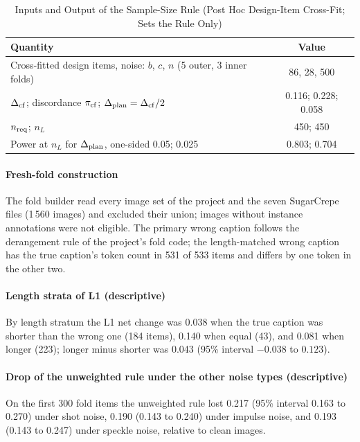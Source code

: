 \documentclass[journal,onecolumn]{IEEEtran}
\theoremstyle{plain}
\begin{document}
\begin{table}[!htbp]
\centering
\caption{Inputs and Output of the Sample-Size Rule (Post Hoc Design-Item Cross-Fit; Sets the Rule Only)}
\label{stab:nrule}
\footnotesize
\begin{tabular}{lc}
\toprule
Quantity & Value \\
\midrule
Cross-fitted design items, noise: $b$, $c$, $n$ (5 outer, 3 inner folds) & 86, 28, 500 \\
$\Delta_{\rm cf}$; discordance $\pi_{\rm cf}$; $\Delta_{\rm plan}=\Delta_{\rm cf}/2$ & 0.116; 0.228; 0.058 \\
$n_{\rm req}$; $n_L$ & 450; 450 \\
Power at $n_L$ for $\Delta_{\rm plan}$, one-sided 0.05; 0.025 & 0.803; 0.704 \\
\bottomrule
\end{tabular}
\end{table}

\paragraph*{Fresh-fold construction}
The fold builder read every image set of the project and the seven SugarCrepe files (1\,560 images) and excluded their union; images
without instance annotations were not eligible.
The primary wrong caption follows the derangement rule of the project's fold code; the length-matched wrong caption has the true caption's
token count in 531 of 533 items and differs by one token in the other two.

\paragraph*{Length strata of L1 (descriptive)}
By length stratum the L1 net change was 0.038 when the true caption was shorter than the wrong one (184 items), 0.140 when equal (43), and
0.081 when longer (223); longer minus shorter was 0.043 (95\% interval $-0.038$ to $0.123$).

\paragraph*{Drop of the unweighted rule under the other noise types (descriptive)}
On the first 300 fold items the unweighted rule lost 0.217 (95\% interval 0.163 to 0.270) under shot noise, 0.190 (0.143 to 0.240) under
impulse noise, and 0.193 (0.143 to 0.247) under speckle noise, relative to clean images.
\end{document}
